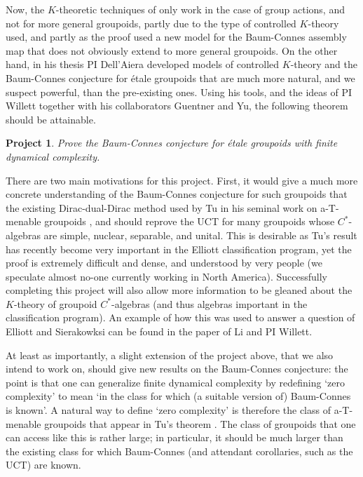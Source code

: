 \documentclass[11pt]{article}
\theoremstyle{plain}
\newtheorem{project}[theorem]{Project}
\theoremstyle{definition}
\theoremstyle{remark}
\begin{document}
Now, the $K$-theoretic techniques of \cite{Guentner:2014bh} only work in the case of group actions, and not for more general groupoids, partly due to the type of controlled $K$-theory used, and partly as the proof used a new model for the Baum-Connes assembly map that does not obviously extend to more general groupoids.  On the other hand, in his thesis PI Dell'Aiera developed models of controlled $K$-theory and the Baum-Connes conjecture for \'{e}tale groupoids that are much more natural, and we suspect powerful, than the pre-existing ones.  Using his tools, and the ideas of PI Willett together with his collaborators Guentner and Yu, the following theorem should be attainable.

\begin{project}
Prove the Baum-Connes conjecture for \'{e}tale groupoids with finite dynamical complexity.
\end{project} 

There are two main motivations for this project.  First, it would give a much more concrete understanding of the Baum-Connes conjecture for such groupoids that the existing Dirac-dual-Dirac method used by Tu in his seminal work on a-T-menable groupoids \cite{Tu:1999bq}, and should reprove the UCT for many  groupoids whose $C^*$-algebras are simple, nuclear, separable, and unital.  This is desirable as Tu's result has recently become very important in the Elliott classification program, yet the proof is extremely difficult and dense, and understood by very people (we speculate almost no-one currently working in North America). Successfully completing this project will also allow more information to be gleaned about the $K$-theory of groupoid $C^*$-algebras (and thus algebras important in the classification program).  An example of how this was used to answer a question of Elliott and Sierakowksi can be found in the paper \cite{Li:2017ac} of Li and PI Willett.

At least as importantly, a slight extension of the project above, that we also intend to work on, should give new results on the Baum-Connes conjecture: the point is that one can generalize finite dynamical complexity by redefining `zero complexity' to mean `in the class for which (a suitable version of) Baum-Connes is known'.  A natural way to define `zero complexity' is therefore the class of a-T-menable groupoids that appear in Tu's theorem \cite{Tu:1999bq}.  The class of groupoids that one can access like this is rather large; in particular, it should be much larger than the existing class for which Baum-Connes (and attendant corollaries, such as the UCT) are known.
\end{document}
